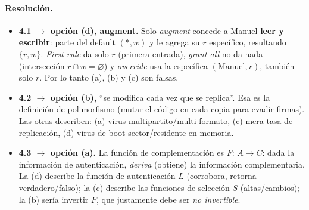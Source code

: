 \paragraph{Resolución.}
\begin{itemize}
  \item \textbf{4.1 $\to$ opción (d), augment.} Solo \emph{augment} concede a Manuel
        \textbf{leer y escribir}: parte del default $(*,w)$ y le agrega su $r$ específico,
        resultando $\{r,w\}$. \emph{First rule} da solo $r$ (primera entrada), \emph{grant all}
        no da nada (intersección $r\cap w=\varnothing$) y \emph{override} usa la específica
        $(\text{Manuel},r)$, también solo $r$. Por lo tanto (a), (b) y (c) son falsas.
  \item \textbf{4.2 $\to$ opción (b),} ``se modifica cada vez que se replica''. Esa es la
        definición de polimorfismo (mutar el código en cada copia para evadir firmas). Las
        otras describen: (a) virus multipartito/multi-formato, (c) mera tasa de replicación,
        (d) virus de boot sector/residente en memoria.
  \item \textbf{4.3 $\to$ opción (a).} La función de complementación es $F:\,A\to C$: dada la
        información de autenticación, \emph{deriva} (obtiene) la información complementaria.
        La (d) describe la función de autenticación $L$ (corrobora, retorna verdadero/falso);
        la (c) describe las funciones de selección $S$ (altas/cambios); la (b) sería invertir
        $F$, que justamente debe ser \emph{no invertible}.
\end{itemize}
